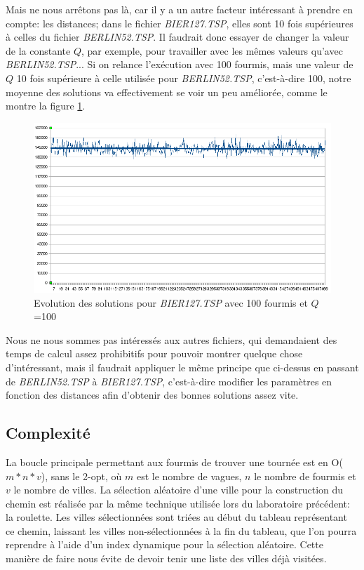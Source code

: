 \documentclass[a4paper, 11pt]{article}
\begin{document}
{	Mais ne nous arrêtons pas là, car il y a un autre facteur intéressant à prendre en compte: les distances; dans le fichier \textit{BIER127.TSP}, elles sont 10 fois supérieures à celles du fichier \textit{BERLIN52.TSP}. Il faudrait donc essayer de changer la valeur de la constante $Q$, par exemple, pour travailler avec les mêmes valeurs qu'avec \textit{BERLIN52.TSP}... Si on relance l'exécution avec 100 fourmis, mais une valeur de $Q$ 10 fois supérieure à celle utilisée pour \textit{BERLIN52.TSP}, c'est-à-dire 100, notre moyenne des solutions va effectivement se voir un peu améliorée, comme le montre la figure \ref{fig:11}.

\begin{figure}[H]
   \begin{center}
      \includegraphics[width=14cm]{../images/11.png}
   \end{center}
   \caption{Evolution des solutions pour \textit{BIER127.TSP} avec 100 fourmis et $Q$=100}
	\label{fig:11}
\end{figure}

	Nous ne nous sommes pas intéressés aux autres fichiers, qui demandaient des temps de calcul assez prohibitifs pour pouvoir montrer quelque chose d'intéressant, mais il faudrait appliquer le même principe que ci-dessus en passant de \textit{BERLIN52.TSP} à \textit{BIER127.TSP}, c'est-à-dire modifier les paramètres en fonction des distances afin d'obtenir des bonnes solutions assez vite.

\subsection{Complexité}

	La boucle principale permettant aux fourmis de trouver une tournée est en O($m * n * v$), sans le 2-opt, où $m$ est le nombre de vagues, $n$ le nombre de fourmis et $v$ le nombre de villes. La sélection aléatoire d'une ville pour la construction du chemin est réalisée par la même technique utilisée lors du laboratoire précédent: la roulette. Les villes sélectionnées sont triées au début du tableau représentant ce chemin, laissant les villes non-sélectionnées à la fin du tableau, que l'on pourra reprendre à l'aide d'un index dynamique pour la sélection aléatoire. Cette manière de faire nous évite de devoir tenir une liste des villes déjà visitées.

}
\end{document}
